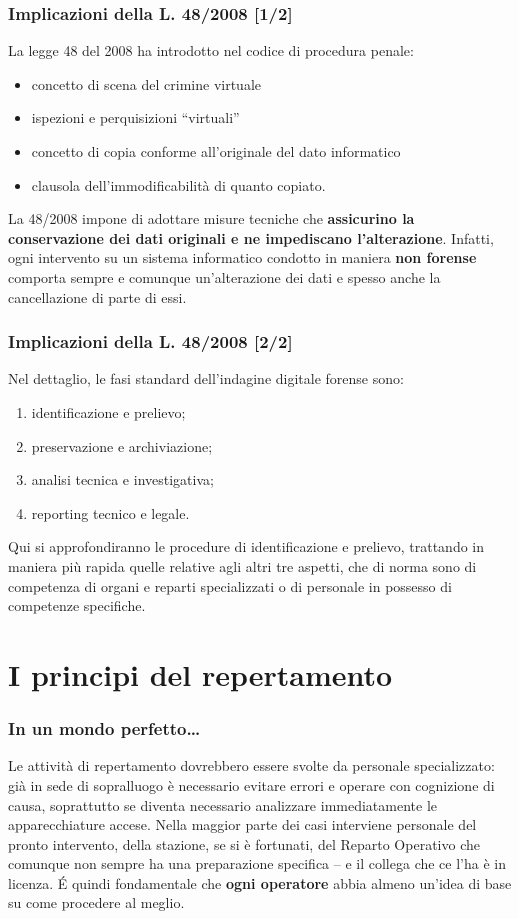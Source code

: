 \documentclass[11pt]{beamer}
\begin{document}
	\begin{frame}
		\frametitle{Implicazioni della L. 48/2008 [1/2]}
		La legge 48 del 2008 ha introdotto nel codice di procedura penale:
		\begin{itemize}
		\item concetto di scena del crimine virtuale
		\item ispezioni e perquisizioni ``virtuali''
		\item concetto di copia conforme all'originale del dato informatico
		\item clausola dell'immodificabilità di quanto copiato.
		\end{itemize}		
		\vfill
		La 48/2008 impone di adottare misure tecniche che \textbf{assicurino la conservazione dei dati originali e ne impediscano l'alterazione}.
		\vfill
		Infatti, ogni intervento su un sistema informatico  condotto in maniera \textbf{non forense} comporta sempre e comunque un'alterazione dei dati e spesso anche la cancellazione di parte di essi.
	\end{frame}
	\begin{frame}
		\frametitle{Implicazioni della L. 48/2008 [2/2]}	
		Nel dettaglio, le fasi standard dell'indagine digitale forense sono:
		\begin{enumerate}
			\item identificazione e prelievo;
			\item preservazione e archiviazione;
			\item analisi tecnica e investigativa;
			\item reporting tecnico e legale.
		\end{enumerate}
		\vfill
		Qui si approfondiranno le procedure di identificazione e prelievo, trattando in maniera più rapida quelle relative agli altri tre aspetti, che di norma sono di competenza di organi e reparti specializzati o di personale in possesso di competenze specifiche.
	\end{frame}
	
	\section[Repertamento]{I principi del repertamento}
	
	\begin{frame}
		\frametitle{In un mondo perfetto\dots}
		Le attività di repertamento dovrebbero essere svolte da personale specializzato: già in sede di sopralluogo è necessario evitare errori e operare con cognizione di causa, soprattutto se diventa necessario analizzare immediatamente le apparecchiature accese.
		\vfill
		Nella maggior parte dei casi interviene personale del pronto intervento, della stazione, se si è fortunati, del Reparto Operativo che comunque non sempre ha una preparazione specifica -- e il collega che ce l'ha è in licenza. 
		\vfill
		\'{E} quindi fondamentale che \textbf{ogni operatore} abbia almeno un'idea di base su come procedere al meglio.
	\end{frame}
	
\end{document}

